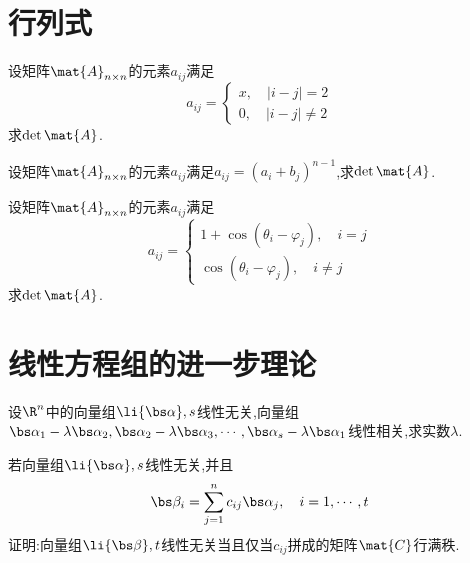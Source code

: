 \documentclass{ctexart}
\title{\tbf{Mid-Term Exam Review}}
\author{夜未央}
\begin{document}
\maketitle
\section{行列式}
\begin{problem}
    设矩阵$\mat{A}_{n\times n}$的元素$a_{ij}$满足
    \[a_{ij}=\left\{\begin{array}{l}
        x,\quad\left|i-j\right|=2\\
        0,\quad\left|i-j\right|\neq2
    \end{array}\right.\]
    求$\det\mat{A}$.
\end{problem}
\begin{problem}
    设矩阵$\mat{A}_{n\times n}$的元素$a_{ij}$满足$a_{ij}=\left(a_i+b_j\right)^{n-1}$,求$\det\mat{A}$.
\end{problem}
\begin{problem}
    设矩阵$\mat{A}_{n\times n}$的元素$a_{ij}$满足
    \[a_{ij}=\left\{\begin{array}{l}
        1+\cos\left(\theta_i-\varphi_j\right),\quad i=j\\
        \cos\left(\theta_i-\varphi_j\right),\quad i\neq j
    \end{array}\right.\]
    求$\det\mat{A}$.
\end{problem}
\section{线性方程组的进一步理论}
\begin{problem}
    设$\R^n$中的向量组$\li{\bs\alpha},s$线性无关,向量组$\bs\alpha_1-\lambda\bs\alpha_2,\bs\alpha_2-\lambda\bs\alpha_3,\cdots,\bs\alpha_s-\lambda\bs\alpha_1$线性相关,求实数$\lambda$.
\end{problem}
\begin{problem}
    若向量组$\li{\bs\alpha},s$线性无关,并且
    \[\bs\beta_i=\sum_{j=1}^{n}c_{ij}\bs\alpha_j,\quad i=1,\cdots,t\]
    证明:向量组$\li{\bs\beta},t$线性无关当且仅当$c_{ij}$拼成的矩阵$\mat{C}$行满秩.
\end{problem}
\end{document}
